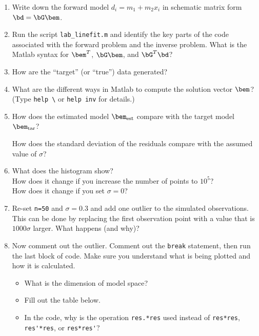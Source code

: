 \documentclass[11pt,titlepage,fleqn]{article}
\newcommand{\vertgap}{\vspace{1cm}}
\begin{document}
\begin{enumerate}
\item Write down the forward model $d_i = m_1 + m_2 x_i$ in schematic matrix form $\bd = \bG\bem$.

\vertgap
\vertgap

\item Run the script \verb+lab_linefit.m+ and identify the key parts of the code associated with the forward problem and the inverse problem. What is the Matlab syntax for $\bem^T$, $\bG\bem$, and $\bG^T\bd$?

\vertgap

\item How are the ``target'' (or ``true'') data generated?

\vertgap

\item What are the different ways in Matlab to compute the solution vector $\bem$? \\
(Type \verb+help \+ or \verb+help inv+ for details.)

\vertgap

\item How does the estimated model $\bem_{\rm est}$ compare with the target model $\bem_{\rm tar}$?

\vertgap

How does the standard deviation of the residuals compare with the assumed value of $\sigma$?

\vertgap

\item What does the histogram show? \\
How does it change if you increase the number of points to $10^5$? \\
How does it change if you set $\sigma = 0$?

\vertgap

\item Re-set \verb+n=50+ and $\sigma = 0.3$ and add one outlier to the simulated observations. This can be done by replacing the first observation point with a value that is $1000\sigma$ larger. What happens (and why)?

\vertgap

\pagebreak
\item Now comment out the outlier. Comment out the \verb+break+ statement, then run the last block of code. Make sure you understand what is being plotted and how it is calculated.
%
\begin{itemize}
\item What is the dimension of model space?
\item Fill out the table below.
\item In the code, why is the operation \verb+res.*res+ used instead of \verb+res*res+, \verb+res'*res+, or \verb+res*res'+?
\end{itemize}


\end{enumerate}
\end{document}
